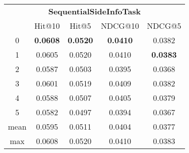 \documentclass{article}
\begin{document}
 

\begin{tabular}{c|cccc}

\multicolumn{5}{c}{\textbf{SequentialSideInfoTask}} \\
\noalign{\smallskip}
\noalign{\smallskip}
\toprule
\multicolumn{1}{c}{Template ID} & \multicolumn{1}{|c}{Hit@10} & \multicolumn{1}{c}{Hit@5} & \multicolumn{1}{c}{NDCG@10} & \multicolumn{1}{c}{NDCG@5} \\
\midrule
0 & \textbf{0.0608} & \textbf{0.0520} & \textbf{0.0410} & 0.0382 \\
1 & 0.0605 & 0.0520 & 0.0410 & \textbf{0.0383} \\
2 & 0.0587 & 0.0503 & 0.0395 & 0.0368 \\
3 & 0.0601 & 0.0519 & 0.0409 & 0.0382 \\
4 & 0.0588 & 0.0507 & 0.0405 & 0.0379 \\
5 & 0.0582 & 0.0497 & 0.0394 & 0.0367 \\
\midrule
mean & 0.0595 & 0.0511 & 0.0404 & 0.0377 \\
max & 0.0608 & 0.0520 & 0.0410 & 0.0383 \\
\bottomrule

\end{tabular}
\end{document}
